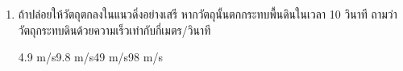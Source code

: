 \begin{enumerate}
\item \runningj \nonet ถ้าปล่อยให้วัตถุตกลงในแนวดิ่งอย่างเสรี    หากวัตถุนั้นตกกระทบพื้นดินในเวลา  10  วินาที   ถามว่าวัตถุกระทบดินด้วยความเร็วเท่ากับกี่เมตร/วินาที
\begin{4c}
	{4.9 m/s}{9.8 m/s}{49 m/s}{98 m/s}
\end{4c}
\end{enumerate}
